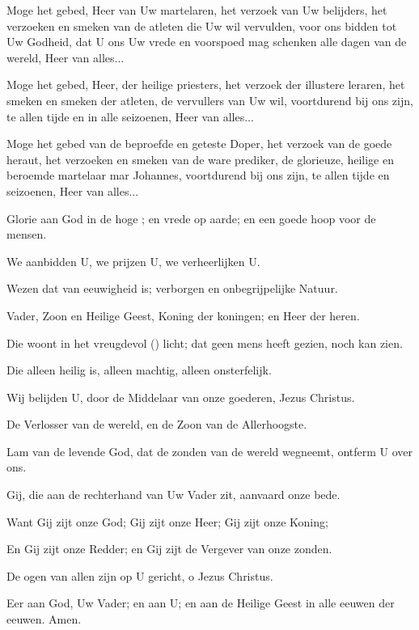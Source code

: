 \documentclass[12pt,twoside,a5paper]{article}
\begin{document}
\begin{halfparskip}
   Moge het gebed, Heer van Uw martelaren, het verzoek van Uw belijders, het verzoeken en smeken van de atleten die Uw wil vervulden, voor ons bidden tot Uw Godheid, dat U ons Uw vrede en voorspoed mag schenken alle dagen van de wereld, Heer van alles...

   Moge het gebed, Heer, der heilige priesters, het verzoek der illustere leraren, het smeken en smeken der atleten, de vervullers van Uw wil, voortdurend bij ons zijn, te allen tijde en in alle seizoenen, Heer van alles...

   Moge het gebed van de beproefde en geteste Doper, het verzoek van de goede heraut, het verzoeken en smeken van de ware prediker, de glorieuze, heilige en beroemde martelaar mar Johannes, voortdurend bij ons zijn, te allen tijde en seizoenen, Heer van alles...
\end{halfparskip}



\begin{halfparskip}
  Glorie aan God in de hoge ; en vrede op aarde; en een goede hoop voor de mensen.

  We aanbidden U, we prijzen U, we verheerlijken U.

  Wezen dat van eeuwigheid is; verborgen en onbegrijpelijke Natuur.

  Vader, Zoon en Heilige Geest, Koning der koningen; en Heer der heren.

  Die woont in het vreugdevol () licht; dat geen mens heeft gezien, noch kan zien.

  Die alleen heilig is, alleen machtig, alleen onsterfelijk.

  Wij belijden U, door de Middelaar van onze goederen, Jezus Christus.

  De Verlosser van de wereld, en de Zoon van de Allerhoogste.

  Lam van de levende God, dat de zonden van de wereld wegneemt, ontferm U over ons.

  Gij, die aan de rechterhand van Uw Vader zit, aanvaard onze bede.

  Want Gij zijt onze God; Gij zijt onze Heer; Gij zijt onze Koning;

  En Gij zijt onze Redder; en Gij zijt de Vergever van onze zonden.

  De ogen van allen zijn op U gericht, o Jezus Christus.

  Eer aan God, Uw Vader; en aan U; en aan de Heilige Geest in alle eeuwen der eeuwen. Amen.
\end{halfparskip}
\end{document}
